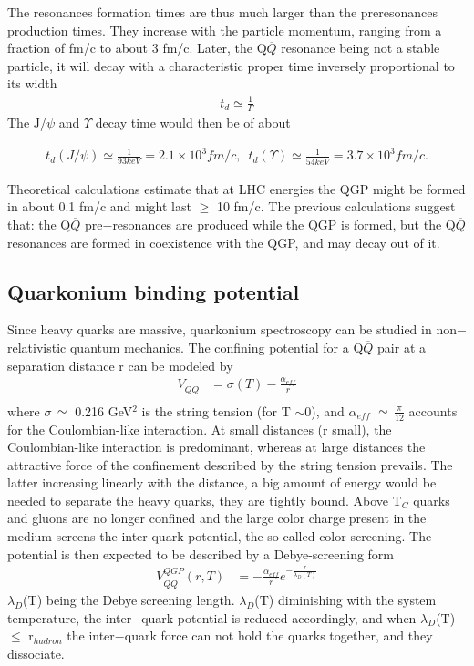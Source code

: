The resonances formation times are thus much larger than the preresonances
production times. They increase with the particle momentum,
ranging from a fraction of fm/c to about 3 fm/c.
Later, the Q$\overline{Q}$ resonance being not a stable particle, it will decay with
a characteristic proper time inversely proportional to its width
\begin{eqnarray}
t_d \simeq \frac{1}{\Gamma}
\end{eqnarray}
The J/$\psi$  and $\Upsilon$ decay time would then be of about

\begin{eqnarray}
t_d(J/\psi) \simeq \frac{1}{93 keV} = 2.1\times10^{3} fm/c, \,\,\,
t_d(\Upsilon) \simeq \frac{1}{54 keV} = 3.7\times10^{3} fm/c.
\end{eqnarray}

Theoretical calculations estimate that at LHC energies the QGP might
be formed in about 0.1 fm/c and might last $\geq$ 10 fm/c. The previous calculations
suggest that: the Q$\overline{Q}$ pre$-$resonances are produced while the QGP is
formed, but the Q$\overline{Q}$ resonances are formed in coexistence with the QGP, and
may decay out of it.

\subsection{Quarkonium binding potential}
Since heavy quarks are massive, quarkonium spectroscopy can be studied in
non$-$relativistic quantum mechanics. The confining potential for a Q$\overline{Q}$ pair 
at a separation distance r can be modeled by \cite{SATZ, SATZ2}
\begin{eqnarray}
V_{Q\overline{Q}} &= \sigma(T)-\frac{\alpha_{eff}}{r} \\
\end{eqnarray}
where $\sigma\,\simeq$ 0.216 GeV$^2$ is the string tension (for T $\sim $0), and 
$\alpha_{eff}\,\,\simeq\,\frac{\pi}{12}$  accounts for the Coulombian-like interaction. 
At small distances (r small), the Coulombian-like interaction is predominant, 
whereas at large distances the attractive force of the confinement described by the 
string tension prevails.
The latter increasing linearly with the distance, a big amount of energy would
be needed to separate the heavy quarks, they are tightly bound. Above T$_C$
quarks and gluons are no longer confined and the large color charge present
in the medium screens the inter-quark potential, the so called color screening.
The potential is then expected to be described by a Debye-screening form
\begin{eqnarray}
V_{Q\overline{Q}}^{QGP} (r,T) &= -\frac{\alpha_{eff}}{r}e^{-\frac{r}{\lambda_D(T)}}
\end{eqnarray}
$\lambda_D$(T) being the Debye screening length.  $\lambda_D$(T) diminishing with the
system temperature, the inter$-$quark potential is reduced accordingly, and when
 $\lambda_D$(T) $\leq$ r$_{hadron}$ the inter$-$quark force can not hold the quarks together, 
and they dissociate.

